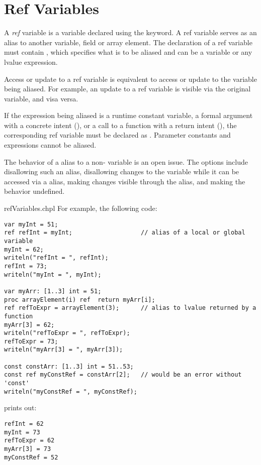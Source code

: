 \section{Ref Variables}
\label{Ref_Variables}

A \emph{ref} variable is a variable declared using the  keyword.
A ref variable serves as an alias to another variable, field or array element.
The declaration of a ref variable must contain ,
which specifies what is to be aliased and can be a variable
or any lvalue expression.

Access or update to a ref variable is equivalent to access or update
to the variable being aliased. For example, an update to a ref variable
is visible via the original variable, and visa versa.

If the expression being aliased is a runtime constant variable,
a formal argument with a  concrete intent
(), or a call to a function with a 
return intent (), the corresponding
ref variable must be declared as .
Parameter constants and expressions cannot be aliased.

\begin{openissue}
The behavior of a  alias to a non- variable
is an open issue. The options include disallowing such an alias,
disallowing changes to the variable while it can be accessed via
a  alias, making changes visible through the alias,
and making the behavior undefined.
\end{openissue}

\begin{chapelexample}{refVariables.chpl}
For example, the following code:

\begin{chapel}
\begin{verbatim}
var myInt = 51;
ref refInt = myInt;                   // alias of a local or global variable
myInt = 62;
writeln("refInt = ", refInt);
refInt = 73;
writeln("myInt = ", myInt);

var myArr: [1..3] int = 51;
proc arrayElement(i) ref  return myArr[i];
ref refToExpr = arrayElement(3);      // alias to lvalue returned by a function
myArr[3] = 62;
writeln("refToExpr = ", refToExpr);
refToExpr = 73;
writeln("myArr[3] = ", myArr[3]);

const constArr: [1..3] int = 51..53;
const ref myConstRef = constArr[2];   // would be an error without 'const'
writeln("myConstRef = ", myConstRef);
\end{verbatim}
\end{chapel}

prints out:

\begin{chapelprintoutput}
\begin{verbatim}
refInt = 62
myInt = 73
refToExpr = 62
myArr[3] = 73
myConstRef = 52
\end{verbatim}
\end{chapelprintoutput}
\end{chapelexample}
